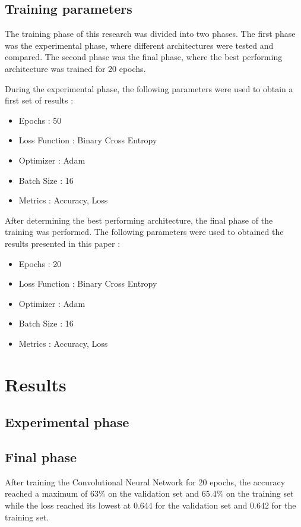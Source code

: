 \documentclass[12pt, letterpaper]{article}
\begin{document}
\subsection{Training parameters}
The training phase of this research was divided into two phases. The first phase was the experimental phase, where different architectures were tested and compared. The second phase was the final phase, where the best performing architecture was trained for 20 epochs.

During the experimental phase, the following parameters were used to obtain a first set of results :
\begin{itemize}
    \item Epochs : 50
    \item Loss Function : Binary Cross Entropy
    \item Optimizer : Adam
    \item Batch Size : 16
    \item Metrics : Accuracy, Loss
\end{itemize}

After determining the best performing architecture, the final phase of the training was performed.
The following parameters were used to obtained the results presented in this paper :
\begin{itemize}
    \item Epochs : 20
    \item Loss Function : Binary Cross Entropy
    \item Optimizer : Adam
    \item Batch Size : 16
    \item Metrics : Accuracy, Loss
\end{itemize}

\newpage
\section{Results}

\subsection{Experimental phase}

\subsection{Final phase}
After training the Convolutional Neural Network for 20 epochs, the accuracy reached a maximum of 63\% on the validation set and 65.4\% on the training set while the loss reached its lowest at 0.644 for the validation set and 0.642 for the training set. 
\end{document}
